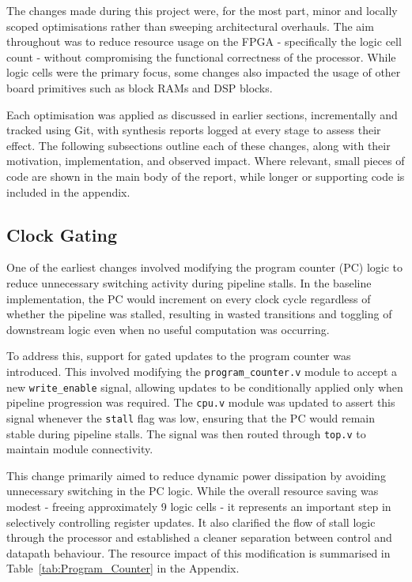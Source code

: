 \documentclass[a4paper,10pt]{article}
\begin{document}
The changes made during this project were, for the most part, 
minor and locally scoped optimisations rather than sweeping architectural overhauls. 
The aim throughout was to reduce resource usage on the FPGA - 
specifically the logic cell count  - 
without compromising the functional correctness of the processor. 
While logic cells were the primary focus, 
some changes also impacted the usage of other board primitives 
such as block RAMs and DSP blocks. 

Each optimisation was applied as discussed in earlier sections,
incrementally and tracked using Git, 
with synthesis reports logged at every stage to assess their effect. 
The following subsections outline each of these changes, 
along with their motivation, implementation, and observed impact. 
Where relevant, small pieces of code are shown in the main body of the report, 
while longer or supporting code is included in the appendix.

\subsection{Clock Gating}
\label{sec:Gating}

One of the earliest changes involved modifying the program counter (PC) logic 
to reduce unnecessary switching activity during pipeline stalls. 
In the baseline implementation, the PC would increment 
on every clock cycle regardless of whether the pipeline was stalled, 
resulting in wasted transitions and toggling of downstream logic even 
when no useful computation was occurring.

To address this, support for gated updates to the program counter was introduced. 
This involved modifying the \texttt{program\_counter.v} module to accept 
a new \texttt{write\_enable} signal, 
allowing updates to be conditionally applied only when 
pipeline progression was required. 
The \texttt{cpu.v} module was updated to assert this signal whenever 
the \texttt{stall} flag was low, 
ensuring that the PC would remain stable during pipeline stalls. 
The signal was then routed through \texttt{top.v} to maintain module connectivity.

This change primarily aimed to reduce dynamic power dissipation by 
avoiding unnecessary switching in the PC logic. 
While the overall resource saving was modest - 
freeing approximately 9 logic cells - 
it represents an important step in selectively controlling register updates. 
It also clarified the flow of stall logic through the processor 
and established a cleaner separation between control and datapath behaviour. 
The resource impact of this modification is 
summarised in Table~\ref{tab:Program_Counter} in the Appendix.
\end{document}
